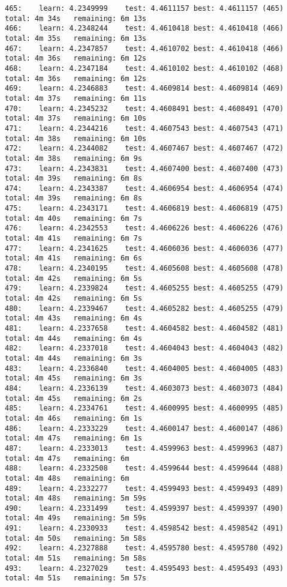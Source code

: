 \documentclass[11pt]{article}
\begin{document}
\begin{Verbatim}[commandchars=\\\{\}]
465:	learn: 4.2349999	test: 4.4611157	best: 4.4611157 (465)	total: 4m 34s	remaining: 6m 13s
466:	learn: 4.2348244	test: 4.4610418	best: 4.4610418 (466)	total: 4m 35s	remaining: 6m 13s
467:	learn: 4.2347857	test: 4.4610702	best: 4.4610418 (466)	total: 4m 36s	remaining: 6m 12s
468:	learn: 4.2347184	test: 4.4610102	best: 4.4610102 (468)	total: 4m 36s	remaining: 6m 12s
469:	learn: 4.2346883	test: 4.4609814	best: 4.4609814 (469)	total: 4m 37s	remaining: 6m 11s
470:	learn: 4.2345232	test: 4.4608491	best: 4.4608491 (470)	total: 4m 37s	remaining: 6m 10s
471:	learn: 4.2344216	test: 4.4607543	best: 4.4607543 (471)	total: 4m 38s	remaining: 6m 10s
472:	learn: 4.2344082	test: 4.4607467	best: 4.4607467 (472)	total: 4m 38s	remaining: 6m 9s
473:	learn: 4.2343831	test: 4.4607400	best: 4.4607400 (473)	total: 4m 39s	remaining: 6m 8s
474:	learn: 4.2343387	test: 4.4606954	best: 4.4606954 (474)	total: 4m 39s	remaining: 6m 8s
475:	learn: 4.2343171	test: 4.4606819	best: 4.4606819 (475)	total: 4m 40s	remaining: 6m 7s
476:	learn: 4.2342553	test: 4.4606226	best: 4.4606226 (476)	total: 4m 41s	remaining: 6m 7s
477:	learn: 4.2341625	test: 4.4606036	best: 4.4606036 (477)	total: 4m 41s	remaining: 6m 6s
478:	learn: 4.2340195	test: 4.4605608	best: 4.4605608 (478)	total: 4m 42s	remaining: 6m 5s
479:	learn: 4.2339824	test: 4.4605255	best: 4.4605255 (479)	total: 4m 42s	remaining: 6m 5s
480:	learn: 4.2339467	test: 4.4605282	best: 4.4605255 (479)	total: 4m 43s	remaining: 6m 4s
481:	learn: 4.2337658	test: 4.4604582	best: 4.4604582 (481)	total: 4m 44s	remaining: 6m 4s
482:	learn: 4.2337018	test: 4.4604043	best: 4.4604043 (482)	total: 4m 44s	remaining: 6m 3s
483:	learn: 4.2336840	test: 4.4604005	best: 4.4604005 (483)	total: 4m 45s	remaining: 6m 3s
484:	learn: 4.2336139	test: 4.4603073	best: 4.4603073 (484)	total: 4m 45s	remaining: 6m 2s
485:	learn: 4.2334761	test: 4.4600995	best: 4.4600995 (485)	total: 4m 46s	remaining: 6m 1s
486:	learn: 4.2333229	test: 4.4600147	best: 4.4600147 (486)	total: 4m 47s	remaining: 6m 1s
487:	learn: 4.2333013	test: 4.4599963	best: 4.4599963 (487)	total: 4m 47s	remaining: 6m
488:	learn: 4.2332508	test: 4.4599644	best: 4.4599644 (488)	total: 4m 48s	remaining: 6m
489:	learn: 4.2332277	test: 4.4599493	best: 4.4599493 (489)	total: 4m 48s	remaining: 5m 59s
490:	learn: 4.2331499	test: 4.4599397	best: 4.4599397 (490)	total: 4m 49s	remaining: 5m 59s
491:	learn: 4.2330933	test: 4.4598542	best: 4.4598542 (491)	total: 4m 50s	remaining: 5m 58s
492:	learn: 4.2327888	test: 4.4595780	best: 4.4595780 (492)	total: 4m 51s	remaining: 5m 58s
493:	learn: 4.2327029	test: 4.4595493	best: 4.4595493 (493)	total: 4m 51s	remaining: 5m 57s

\end{Verbatim}
\end{document}
